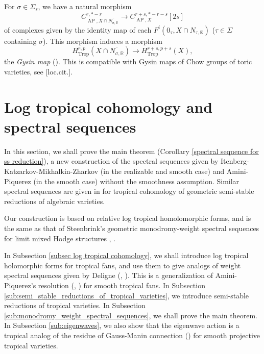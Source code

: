 \documentclass[12pt,a4]{amsart}
\def\R{\mathbb{R}}
\def\AP{\mathop{\mathrm{AP}}\nolimits}
\def\Trop{\mathop{\mathrm{trop}}\nolimits}
\def\Trop{\mathop{\mathrm{Trop}}\nolimits}
\numberwithin{equation}{section}
\numberwithin{figure}{section}
\begin{document}
  For $\sigma \in \Sigma_s$, 
   we have a natural morphism 
    $$  C^{r,*-r}_{\AP, X \cap \overline{N_{\sigma,\R}}} 
        \to  
        C^{r+s,*-r-s}_{\AP, X } [2s]  
        $$
    of complexes
    given by the identity map of 
    each $F^i (0_\tau, X \cap N_{\tau,\R})$ 
    ($\tau \in \Sigma$ containing $\sigma$).
  This morphism induces a morphism 
    $$  H^{r, p }_{\Trop} ( X \cap \overline{N_{\sigma,\R}} ) 
    \to H^{r+s, p+s}_{\Trop} 
    ( X ), $$
    the \emph{Gysin map} 
    (\cite[Remark 3.15]{AminiPiquerezHodgetheoryfortropicalvarieties2020}).
  This is compatible with Gysin maps of Chow groups of toric varieties, see [loc.cit.].

\section{Log tropical cohomology and spectral sequences}
  \label{sec:log_tropical_cohomology_and_spectral_sequences}
  In this section, we shall prove the main theorem 
  (Corollary \ref{spectral sequence for ss reduction}), 
  a new construction of 
  the spectral sequences given by Itenberg-Katzarkov-Mikhalkin-Zharkov \cite{ItenbergKatzarkovMikhalkinZharkovTropicalhomology2019} 
  (in the realizable and smooth case)
  and Amini-Piquerez \cite{AminiPiquerezHodgetheoryfortropicalvarieties2020}  
  (in the smooth case)
  without the smoothness assumption.
  Similar spectral sequences are given in  \cite{MikamiOntropicalcycleclassmaps2020} 
   for tropical cohomology of geometric semi-stable reductions of algebraic varieties. 

   Our construction is 
     based on relative log tropical homolomorphic forms,
     and is 
   the same as that of Steenbrink's geometric monodromy-weight spectral sequences 
   for 
  limit mixed Hodge structures \cite[Corollary 4.20]{SteenbrinkLimitsofHodgestructures1976}, \cite[Chapter 11]{PetersSteenbrinkMixedHodgestructures2008}.

  In Subsection \ref{subsec log tropical cohomology}, we shall introduce log tropical holomorphic forms for tropical fans, 
  and use them to give analogs of weight spectral sequences given by Deligne 
  (\cite{DeligneThoriedeHodgeII1972}, 
  \cite[Chapter 4]{PetersSteenbrinkMixedHodgestructures2008}). 
  This is a generalization of Amini-Piquerez's resolution 
  (\cite{AminiPiquerezHomologyoftropicalfans2021},  \cite{AminiPiquerezHomologicalsmoothnessandDeligneresolutionfortropicalfans2024})
  for smooth tropical fans. 
  In Subsection \ref{sub:semi_stable_reductions_of_tropical_varieties}, 
   we introduce semi-stable reductions of tropical varieties. 
   In Subsection \ref{sub:monodromy_weight_spectral_sequences}, we shall prove the main theorem.
  In Subsection \ref{sub:eigenwaves}, 
   we also show that the eigenwave action is a tropical analog of the residue of Gauss-Manin connection () for smooth projective tropical varieties.  
\end{document}
